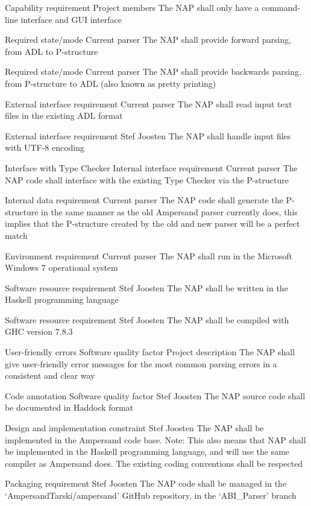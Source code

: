 		{Capability requirement}
		{Project members}
		{The NAP shall only have a command-line interface and GUI interface}
		
		{Required state/mode}
		{Current parser}
		{The NAP shall provide forward parsing, from ADL to P-structure}
	
		{Required state/mode}
		{Current parser}
		{The NAP shall provide backwards parsing, from P-structure to ADL (also known as pretty printing)}

		{External interface requirement}
		{Current parser}
		{The NAP shall read input text files in the existing ADL format}

		{External interface requirement}
		{Stef Joosten}
		{The NAP shall handle input files with UTF-8 encoding}

		{Interface with Type Checker}
		{Internal interface requirement}
		{Current parser}
		{The NAP code shall interface with the existing Type Checker via the P-structure}

		{Internal data requirement}
		{Current parser}
		{The NAP code shall generate the P-structure in the same manner as the old Ampersand parser currently does,
		this implies that the P-structure created by the old and new parser will be a perfect match}

		{Environment requirement}
		{Current parser}
		{The NAP shall run in the Microsoft Windows 7 operational system}

		{Software resource requirement}
		{Stef Joosten}
		{The NAP shall be written in the Haskell programming language}
		
		{Software resource requirement}
		{Stef Joosten}
		{The NAP shall be compiled with GHC version 7.8.3}

		{User-friendly errors}
		{Software quality factor}
		{Project description}
		{The NAP shall give user-friendly error messages for the most common parsing errors in a consistent and clear way}

		{Code annotation}
		{Software quality factor}
		{Stef Joosten}
		{The NAP source code shall be documented in Haddock format}

		{Design and implementation constraint}
		{Stef Joosten}
		{The NAP shall be implemented in the Ampersand code base.\newline
		Note: This also means that NAP shall be implemented in the Haskell programming language, and will use the same compiler as Ampersand does.
		The existing coding conventions shall be respected}

		{Packaging requirement}
		{Stef Joosten}
		{The NAP code shall be managed in the `AmpersandTarski/ampersand' GitHub repository, in the `ABI\_Parser' branch}

